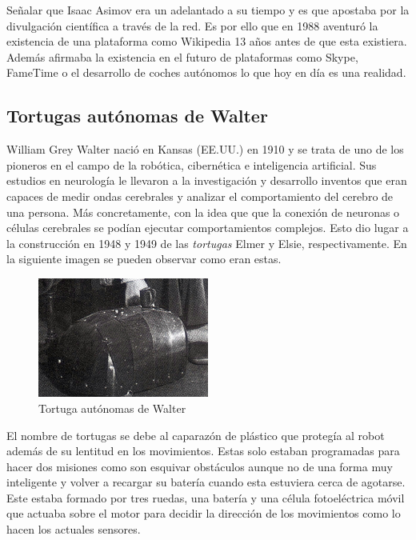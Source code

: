 Señalar que Isaac Asimov era un adelantado a su tiempo y es que apostaba por la divulgación científica a través de la red. Es por ello que en 1988 aventuró la existencia de una plataforma como Wikipedia 13 años antes de que esta existiera. Además afirmaba la existencia en el futuro de plataformas como Skype, FameTime o el desarrollo de coches autónomos lo que hoy en día es una realidad.



\subsection{Tortugas autónomas de Walter}

William Grey Walter nació en Kansas (EE.UU.) en 1910 y se trata de uno de los pioneros en el campo de la robótica, cibernética e inteligencia artificial. Sus estudios en neurología le llevaron a la investigación y desarrollo inventos que eran capaces de medir ondas cerebrales y analizar el comportamiento del cerebro de una persona. Más concretamente, con la idea que que la conexión de neuronas o células cerebrales se podían ejecutar comportamientos complejos. Esto dio lugar a la construcción en 1948 y 1949 de las \textit{tortugas} Elmer y Elsie, respectivamente. En la siguiente imagen se pueden observar como eran estas.

\begin{figure}[H]
\begin{center}
  \includegraphics[width=0.5\textwidth]{./EtapaPrimeriza/imagenes/tortuga.jpg}
  \caption{Tortuga autónomas de Walter}
  \label{tortuga}
\end{center}
\end{figure}

El nombre de tortugas se debe al caparazón de plástico que protegía al robot además de su lentitud en los movimientos. Estas solo estaban programadas para hacer dos misiones como son esquivar obstáculos aunque no de una forma muy inteligente y volver a recargar su batería cuando esta estuviera cerca de agotarse. Este estaba formado por tres ruedas, una batería y una célula fotoeléctrica móvil que actuaba sobre el motor para decidir la dirección de los movimientos como lo hacen los actuales sensores.

